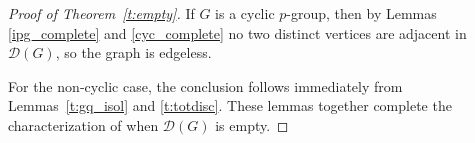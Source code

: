 \documentclass[12pt]{amsart}
\theoremstyle{plain}
\theoremstyle{remark}
\newtheorem{remark}[theorem]{Remark}
\theoremstyle{definition}
\begin{document}
\begin{proof}[Proof of Theorem~\ref{t:empty}]
If \(G\) is a cyclic \(p\)-group, then by Lemmas \ref{ipg_complete} and \ref{cyc_complete} no two distinct vertices are adjacent in \(\mathcal{D}(G)\), so the graph is edgeless.

For the non‑cyclic case, the conclusion follows immediately from Lemmas~\ref{t:gq_isol} and \ref{t:totdisc}. These lemmas together complete the characterization of when \(\mathcal{D}(G)\) is empty.
\end{proof}

\end{document}
